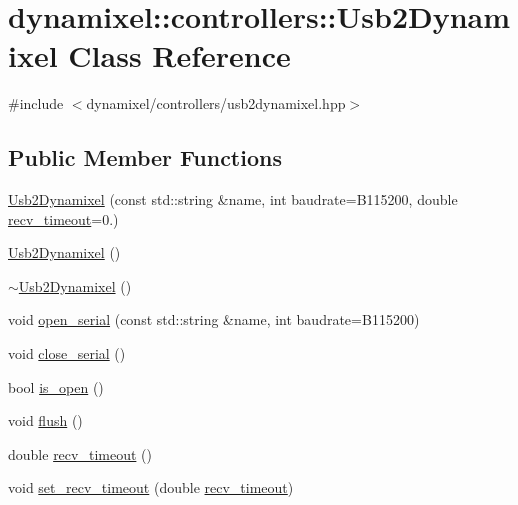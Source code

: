 \hypertarget{classdynamixel_1_1controllers_1_1_usb2_dynamixel}{}\section{dynamixel\+:\+:controllers\+:\+:Usb2\+Dynamixel Class Reference}
\label{classdynamixel_1_1controllers_1_1_usb2_dynamixel}


{\ttfamily \#include $<$dynamixel/controllers/usb2dynamixel.\+hpp$>$}

\subsection*{Public Member Functions}
\begin{DoxyCompactItemize}
\item 
\hyperlink{classdynamixel_1_1controllers_1_1_usb2_dynamixel_aa3baa5452d4935a9eac5a912fccda71d}{Usb2\+Dynamixel} (const std\+::string \&name, int baudrate=B115200, double \hyperlink{classdynamixel_1_1controllers_1_1_usb2_dynamixel_a37d9c93fd6d863b90015972a4fa77639}{recv\+\_\+timeout}=0.)
\item 
\hyperlink{classdynamixel_1_1controllers_1_1_usb2_dynamixel_af37a6c8e673f42919d26be8852607c0c}{Usb2\+Dynamixel} ()
\item 
\hyperlink{classdynamixel_1_1controllers_1_1_usb2_dynamixel_ae83bb405d882ee185f4172c61592b89c}{$\sim$\+Usb2\+Dynamixel} ()
\item 
void \hyperlink{classdynamixel_1_1controllers_1_1_usb2_dynamixel_af9d57bff8175e6c5b84ceb27cc712691}{open\+\_\+serial} (const std\+::string \&name, int baudrate=B115200)
\item 
void \hyperlink{classdynamixel_1_1controllers_1_1_usb2_dynamixel_a305726735f3fc48ab8f68e93f7c82207}{close\+\_\+serial} ()
\item 
bool \hyperlink{classdynamixel_1_1controllers_1_1_usb2_dynamixel_a49292efb6f4ac4c063ce079be40ef5f5}{is\+\_\+open} ()
\item 
void \hyperlink{classdynamixel_1_1controllers_1_1_usb2_dynamixel_a0c0e47a2c3f1ccd6424430dd6891184f}{flush} ()
\item 
double \hyperlink{classdynamixel_1_1controllers_1_1_usb2_dynamixel_a37d9c93fd6d863b90015972a4fa77639}{recv\+\_\+timeout} ()
\item 
void \hyperlink{classdynamixel_1_1controllers_1_1_usb2_dynamixel_a2e592ebefd50aa3794d811bb945d96e9}{set\+\_\+recv\+\_\+timeout} (double \hyperlink{classdynamixel_1_1controllers_1_1_usb2_dynamixel_a37d9c93fd6d863b90015972a4fa77639}{recv\+\_\+timeout})

\end{DoxyCompactItemize}
